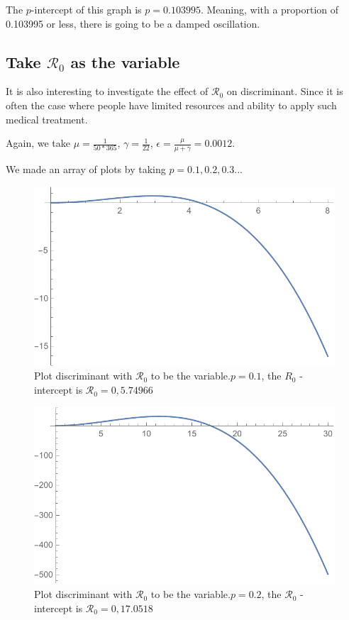 \documentclass[12pt]{article}
\newcommand{\R}{\mathcal{R}}
\begin{document}
The $p$-intercept of this graph is $p=0.103995$. Meaning, with a proportion of 0.103995 or less, there is going to be a damped oscillation.

\subsection{Take $\R_0$ as the variable}
It is also interesting to investigate the effect of $\R_0$ on discriminant. Since it is often the case where people have limited resources and ability to apply such medical treatment.

Again, we take $\mu=\frac{1}{50*365}$, $\gamma=\frac{1}{22}$, $\epsilon=\frac{\mu}{\mu+\gamma}=0.0012$.

We made an array of plots by taking $p=0.1,0.2,0.3...$

\begin{figure}[H]
  \caption{Plot discriminant with $\R_0$ to be the variable.$p=0.1$, the $R_0$ -intercept is $\R_0 = 0, 5.74966$}
  \centering
  \includegraphics[width=1.1\textwidth]{Figures/Plot_R_0_p_0_1.pdf}
\end{figure}

\begin{figure}[H]
  \caption{Plot discriminant with $\R_0$ to be the variable.$p=0.2$, the $\R_0$ -intercept is $\R_0 = 0, 17.0518$}
  \centering
  \includegraphics[width=1.1\textwidth]{Figures/Plot_R_0_p_0_2.pdf}
\end{figure}
\end{document}
